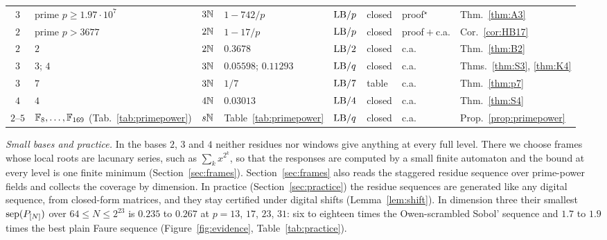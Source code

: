 \begin{table}[t]
\begin{tabular}{@{}c>{\raggedright\arraybackslash}p{}l>{\raggedright\arraybackslash}p{}lll>{\raggedright\arraybackslash}p{}@{}}
$3$ & prime $p\ge1.97\cdot10^7$ & $3\mathbb{N}$ & $1-742/p$ & $\mathrm{LB}/p$ & closed & proof${}^\star$ & Thm.~\ref{thm:A3}\\
$2$ & prime $p>3677$ & $2\mathbb{N}$ & $1-17/p$ & $\mathrm{LB}/p$ & closed & proof${}+{}$c.a. & Cor.~\ref{cor:HB17}\\
$2$ & $2$ & $2\mathbb{N}$ & $0.3678$ & $\mathrm{LB}/2$ & closed & c.a. & Thm.~\ref{thm:B2}\\
$3$ & $3$; $4$ & $3\mathbb{N}$ & $0.05598$; $0.11293$ & $\mathrm{LB}/q$ & closed & c.a. & Thms.~\ref{thm:S3}, \ref{thm:K4}\\
$3$ & $7$ & $3\mathbb{N}$ & $1/7$ & $\mathrm{LB}/7$ & table & c.a. & Thm.~\ref{thm:p7}\\
$4$ & $4$ & $4\mathbb{N}$ & $0.03013$ & $\mathrm{LB}/4$ & closed & c.a. & Thm.~\ref{thm:S4}\\
$2$--$5$ & $\mathbb{F}_8,\dots,\mathbb{F}_{169}$ (Tab.~\ref{tab:primepower}) & $s\mathbb{N}$ & Table~\ref{tab:primepower} & $\mathrm{LB}/q$ & closed & c.a. & Prop.~\ref{prop:primepower}\\
\bottomrule
\end{tabular}
\end{table}

\emph{Small bases and practice.} In the bases $2$, $3$ and $4$ neither residues nor windows give anything at every full level. There we choose frames whose local roots are lacunary series, such as $\sum_kx^{2^k}$, so that the responses are computed by a small finite automaton and the bound at every level is one finite minimum (Section~\ref{sec:frames}). Section~\ref{sec:frames} also reads the staggered residue sequence over prime-power fields and collects the coverage by dimension. In practice (Section~\ref{sec:practice}) the residue sequences are generated like any digital sequence, from closed-form matrices, and they stay certified under digital shifts (Lemma~\ref{lem:shift}). In dimension three their smallest $\operatorname{sep}(P_{[N]})$ over $64\le N\le2^{23}$ is $0.235$ to $0.267$ at $p=13$, $17$, $23$, $31$: six to eighteen times the Owen-scrambled Sobol' sequence and $1.7$ to $1.9$ times the best plain Faure sequence (Figure~\ref{fig:evidence}, Table~\ref{tab:practice}).

